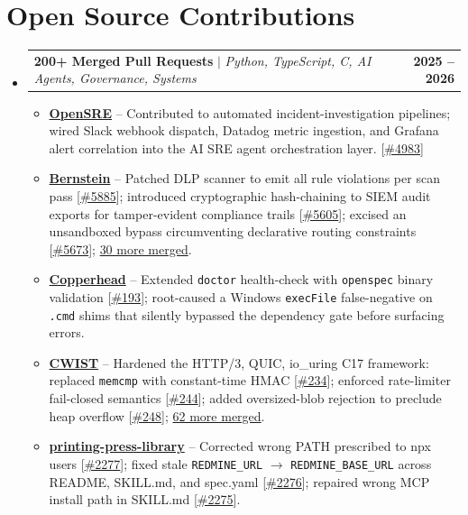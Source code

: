 \documentclass[letterpaper,10pt]{article}
\makeatletter
\newcommand{\resumeItem}[1]{
  \item\small{
    {#1 \vspace{-2pt}}
  }
}
\newcommand{\resumeProjectHeading}[2]{
    \item
    \begin{tabular*}{1.001\textwidth}{l@{\extracolsep{\fill}}r}
      \small#1 & \textbf{\small #2}\\
    \end{tabular*}\vspace{-7pt}
}
\newcommand{\resumeSubHeadingListStart}{\begin{itemize}[leftmargin=0.0in, label={}]}
\newcommand{\resumeSubHeadingListEnd}{\end{itemize}}
\newcommand{\resumeItemListStart}{\begin{itemize}}
\newcommand{\resumeItemListEnd}{\end{itemize}\vspace{-5pt}}
\makeatother
\begin{document}
\section{Open Source Contributions}
    \vspace{-5pt}
    \resumeSubHeadingListStart
      \resumeProjectHeading
          {\textbf{200+ Merged Pull Requests} $|$ \emph{Python, TypeScript, C, AI Agents, Governance, Systems}}{2025 -- 2026}
          \resumeItemListStart
            \resumeItem{\href{https://github.com/Tracer-Cloud/opensre}{\textbf{OpenSRE}} -- Contributed to automated incident-investigation pipelines; wired Slack webhook dispatch, Datadog metric ingestion, and Grafana alert correlation into the AI SRE agent orchestration layer. [\href{https://github.com/Tracer-Cloud/opensre/pull/4983}{\#4983}]}
            \resumeItem{\href{https://github.com/sipyourdrink-ltd/bernstein}{\textbf{Bernstein}} -- Patched DLP scanner to emit all rule violations per scan pass [\href{https://github.com/sipyourdrink-ltd/bernstein/pull/5885}{\#5885}]; introduced cryptographic hash-chaining to SIEM audit exports for tamper-evident compliance trails [\href{https://github.com/sipyourdrink-ltd/bernstein/pull/5605}{\#5605}]; excised an unsandboxed bypass circumventing declarative routing constraints [\href{https://github.com/sipyourdrink-ltd/bernstein/pull/5673}{\#5673}]; \href{https://github.com/sipyourdrink-ltd/bernstein/pulls?q=is\%3Apr+author\%3ABhumika-1432006+is\%3Amerged}{30 more merged}.}
            \resumeItem{\href{https://github.com/copperheadhq/copperhead}{\textbf{Copperhead}} -- Extended \texttt{doctor} health-check with \texttt{openspec} binary validation [\href{https://github.com/copperheadhq/copperhead/pull/193}{\#193}]; root-caused a Windows \texttt{execFile} false-negative on \texttt{.cmd} shims that silently bypassed the dependency gate before surfacing errors.}
            \resumeItem{\href{https://github.com/c4punks/CWIST}{\textbf{CWIST}} -- Hardened the HTTP/3, QUIC, io\_uring C17 framework: replaced \texttt{memcmp} with constant-time HMAC [\href{https://github.com/c4punks/CWIST/pull/234}{\#234}]; enforced rate-limiter fail-closed semantics [\href{https://github.com/c4punks/CWIST/pull/244}{\#244}]; added oversized-blob rejection to preclude heap overflow [\href{https://github.com/c4punks/CWIST/pull/248}{\#248}]; \href{https://github.com/c4punks/CWIST/pulls?q=is\%3Apr+author\%3ABhumika-1432006+is\%3Amerged}{62 more merged}.}
            \resumeItem{\href{https://github.com/mvanhorn/printing-press-library}{\textbf{printing-press-library}} -- Corrected wrong PATH prescribed to npx users [\href{https://github.com/mvanhorn/printing-press-library/pull/2277}{\#2277}]; fixed stale \texttt{REDMINE\_URL} $\to$ \texttt{REDMINE\_BASE\_URL} across README, SKILL.md, and spec.yaml [\href{https://github.com/mvanhorn/printing-press-library/pull/2276}{\#2276}]; repaired wrong MCP install path in SKILL.md [\href{https://github.com/mvanhorn/printing-press-library/pull/2275}{\#2275}].}
          \resumeItemListEnd
    \resumeSubHeadingListEnd
    \vspace{-4pt}
\end{document}
